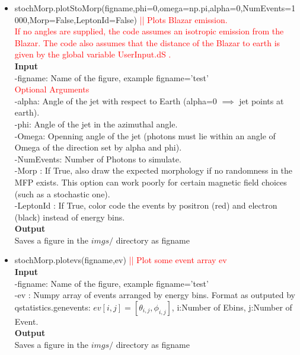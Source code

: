 \documentclass[article, superscriptaddress, ctexart, nofootinbib]{revtex4}
\newcommand{\tcr}{\textcolor{red}}
\begin{document}
\begin{itemize}
 \item{stochMorp.plotStoMorp(figname,phi=0,omega=np.pi,alpha=0,NumEvents=1000,Morp=False,LeptonId=False) \tcr{|| Plots Blazar emission.}}\\
 \tcr{If no angles are supplied, the code assumes an isotropic emission from the Blazar. The code also assumes that the distance of the Blazar to 
 earth is given by the global variable UserInput.dS .}\\
 {\bf{Input}}\\
 -figname: Name of the figure, example figname='test'\\
 \tcr{Optional Arguments}\\
 -alpha: Angle of the jet with respect to Earth (alpha=0 $\implies$ jet points at earth).\\
 -phi: Angle of the jet in the azimuthal angle.\\
 -Omega: Openning angle of the jet (photons must lie within an angle of Omega of the direction set by alpha and phi).\\
 -NumEvents: Number of Photons to simulate.\\
 -Morp : If True, also draw the expected morphology if no randomness in the MFP exists. This option can work poorly for certain magnetic field choices (such as a stochastic one).\\
 -LeptonId : If True, color code the events by positron (red) and electron (black) instead of energy bins.\\
 {\bf{Output}}\\
 Saves a figure in the $imgs/$ directory as figname
 \item{stochMorp.plotevs(figname,ev) \tcr{|| Plot some event array ev}}\\
 {\bf{Input}}\\
 -figname: Name of the figure, example figname='test'\\
 -ev : Numpy array of events arranged by energy bins. Format as outputed by qstatistics.genevents: $ev[i,j]=[\theta_{i,j},\phi_{i,j}]$, i:Number of Ebins, j:Number of Event.\\
 {\bf{Output}}\\
 Saves a figure in the $imgs/$ directory as figname\\
 \end{itemize}
\end{document}
